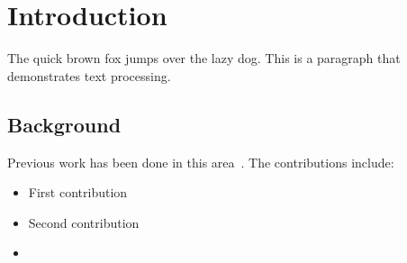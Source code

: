 \section{Introduction}
\label{sec:intro}

The quick brown fox jumps over the lazy dog. This is a  paragraph that demonstrates text processing.

\subsection{Background}
\label{subsec:background}

Previous work has been done in this area~\cite{ref2021}. The  contributions include:
\begin{itemize}
    \item First contribution
    \item Second contribution
    \item {}
\end{itemize}